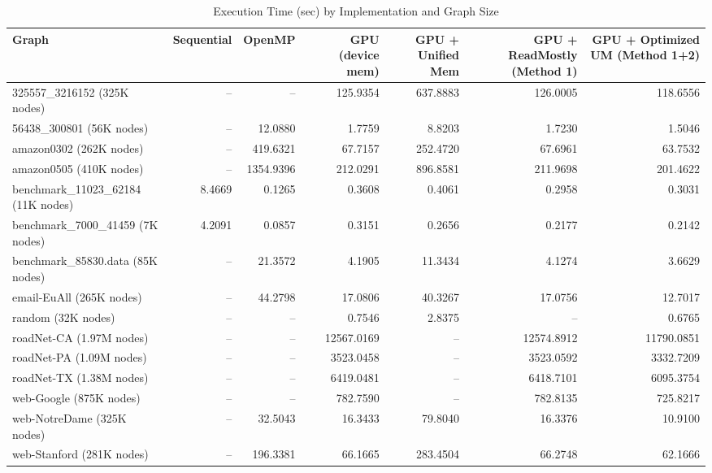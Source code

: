 \begin{table}[h]
\centering
\caption{Execution Time (sec) by Implementation and Graph Size}
\label{tab:exec_time}
\begin{tabular}{lrrrrrr}
\hline
Graph & Sequential & OpenMP & GPU (device mem) & GPU + Unified Mem & GPU + ReadMostly (Method 1) & GPU + Optimized UM (Method 1+2) \\
\hline
325557_3216152 (325K nodes) & -- & -- & 125.9354 & 637.8883 & 126.0005 & 118.6556 \\
56438_300801 (56K nodes) & -- & 12.0880 & 1.7759 & 8.8203 & 1.7230 & 1.5046 \\
amazon0302 (262K nodes) & -- & 419.6321 & 67.7157 & 252.4720 & 67.6961 & 63.7532 \\
amazon0505 (410K nodes) & -- & 1354.9396 & 212.0291 & 896.8581 & 211.9698 & 201.4622 \\
benchmark_11023_62184 (11K nodes) & 8.4669 & 0.1265 & 0.3608 & 0.4061 & 0.2958 & 0.3031 \\
benchmark_7000_41459 (7K nodes) & 4.2091 & 0.0857 & 0.3151 & 0.2656 & 0.2177 & 0.2142 \\
benchmark_85830.data (85K nodes) & -- & 21.3572 & 4.1905 & 11.3434 & 4.1274 & 3.6629 \\
email-EuAll (265K nodes) & -- & 44.2798 & 17.0806 & 40.3267 & 17.0756 & 12.7017 \\
random (32K nodes) & -- & -- & 0.7546 & 2.8375 & -- & 0.6765 \\
roadNet-CA (1.97M nodes) & -- & -- & 12567.0169 & -- & 12574.8912 & 11790.0851 \\
roadNet-PA (1.09M nodes) & -- & -- & 3523.0458 & -- & 3523.0592 & 3332.7209 \\
roadNet-TX (1.38M nodes) & -- & -- & 6419.0481 & -- & 6418.7101 & 6095.3754 \\
web-Google (875K nodes) & -- & -- & 782.7590 & -- & 782.8135 & 725.8217 \\
web-NotreDame (325K nodes) & -- & 32.5043 & 16.3433 & 79.8040 & 16.3376 & 10.9100 \\
web-Stanford (281K nodes) & -- & 196.3381 & 66.1665 & 283.4504 & 66.2748 & 62.1666 \\
\hline
\end{tabular}
\end{table}
